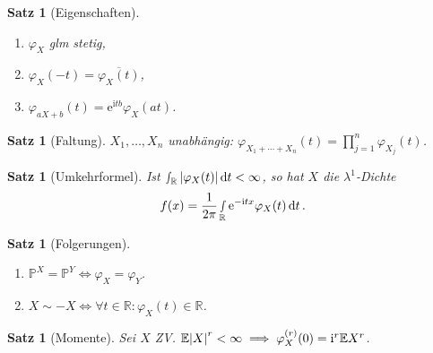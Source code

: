 \documentclass[a4paper,8pt]{article}
\theoremstyle{nonumberbreak}
\newtheorem{satz}[definition]{Satz}
\newcommand{\conj}{\overline}
\renewcommand{\P}{\mathbb{P}}
\newcommand{\R}{\mathbb{R}}
\newcommand{\E}{\mathbb{E}}
\newcommand{\cf}{\varphi}
\newcommand{\e}{\mathrm{e}}
\renewcommand{\i}{\mathrm{i}}
\begin{document}
\begin{multicols}{3}
\begin{satz}[Eigenschaften]
{\begin{multicols}{2}
\begin{enumerate}[label=(\alph*)]
			\item $\cf_X$ glm stetig,
			\item $\cf_X(-t) = \conj{\cf_X(t)}$,
			\item $\cf_{aX+b}(t) = \e^{\i tb}\cf_X(at)$.
		\end{enumerate}
		\end{multicols}}
	\end{satz}
	\begin{satz}[Faltung]
		$X_1,\ldots,X_n$ unabhängig: $\cf_{X_1+\cdots+X_n}(t)=\prod_{j=1}^n\cf_{X_j}(t)$.
	\end{satz}
	\begin{satz}[Umkehrformel]
		Ist $\smallint_\R\abs{\cf_X(t)}\dd{t}<\infty$, so hat $X$ die
		$\lambda^1$-Dichte \[f(x) = \frac{1}{2\pi}\smallint_\R\e^{-\i tx}\cf_X(t)\dd{t}.\]
	\end{satz}
	\begin{satz}[Folgerungen]
		\begin{enumerate}[label=(\alph*)]
			\item $\P^X=\P^Y\iff\cf_X=\cf_Y$.
			\item $X\sim -X\iff \forall t\in\R:\cf_X(t)\in\R$.
		\end{enumerate}
	\end{satz}
	\begin{satz}[Momente]
		Sei $X$ ZV. $\E \abs{X}^r < \infty \implies \cf_X^{(r)}(0) = \i^r \E X^r$.
		

\end{satz}
\end{multicols}
\end{document}
